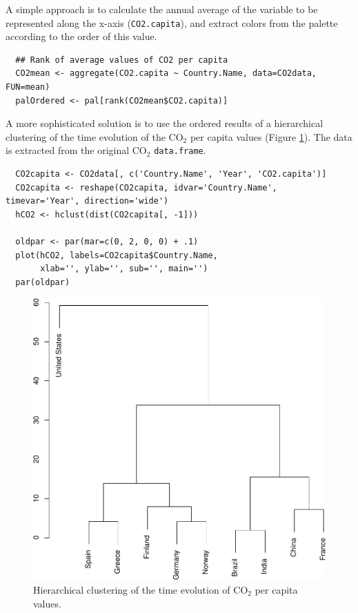 A simple approach is to calculate the annual average of the
variable to be represented along the x-axis (\texttt{CO2.capita}), and
extract colors from the palette according to the order of this
value.  


\lstset{language=r,label= ,caption= ,captionpos=b,numbers=none}
\begin{lstlisting}
  ## Rank of average values of CO2 per capita
  CO2mean <- aggregate(CO2.capita ~ Country.Name, data=CO2data, FUN=mean)
  palOrdered <- pal[rank(CO2mean$CO2.capita)]  
\end{lstlisting}

A more sophisticated solution is to use the ordered results of a
hierarchical clustering of the time evolution of the \(\mathrm{CO_2}\) per capita
values (Figure \ref{fig:hclustCO2}). The data is extracted from the
original \(\mathrm{CO_2}\) \texttt{data.frame}.  


\lstset{language=r,label= ,caption= ,captionpos=b,numbers=none}
\begin{lstlisting}
  CO2capita <- CO2data[, c('Country.Name', 'Year', 'CO2.capita')]
  CO2capita <- reshape(CO2capita, idvar='Country.Name', timevar='Year', direction='wide')
  hCO2 <- hclust(dist(CO2capita[, -1]))
  
  oldpar <- par(mar=c(0, 2, 0, 0) + .1)
  plot(hCO2, labels=CO2capita$Country.Name,
       xlab='', ylab='', sub='', main='')
  par(oldpar)
\end{lstlisting}

\begin{figure}[htbp]
\centering
\includegraphics[width=.9\linewidth]{figs/hclust.pdf}
\caption{Hierarchical clustering of the time evolution of \(\mathrm{CO_2}\) per capita values. \label{fig:hclustCO2}}
\end{figure}


